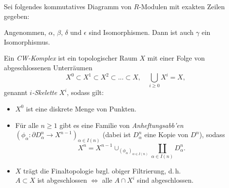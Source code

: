 \documentclass{cheat-sheet}
\begin{document}
\begin{lem}
  Sei folgendes kommutatives Diagramm von $R$-Modulen mit exakten Zeilen gegeben:
  \begin{center}
  \end{center}
  Angenommen, $\alpha$, $\beta$, $\delta$ und $\epsilon$ sind Isomorphismen. Dann ist auch $\gamma$ ein Isomorphismus.
\end{lem}


\begin{defn}
  Ein \emph{CW-Komplex} ist ein topologischer Raum $X$ mit einer Folge von abgeschlossenen Unterräumen
  \[
    X^0 \subset X^1 \subset X^2 \subset ... \subset X, \quad
    \bigcup_{i \geq 0} X^i = X,
  \]
  genannt \emph{$i$-Skelette} $X^i$, sodass gilt:
  \begin{itemize}
    \item $X^0$ ist eine diskrete Menge von Punkten.
    \item Für alle $n \geq 1$ gibt es eine Familie von \emph{Anheftungsabb'en} $(\phi_\alpha : \partial D^n_\alpha \to X^{n-1})_{\alpha \in I(n)}$ (dabei ist $D^n_\alpha$ eine Kopie von $D^n$), sodass
    \[ X^n = X^{n-1} \cup_{(\phi_\alpha)_{\alpha \in I(n)}} \coprod_{\alpha \in I(n)} D^n_\alpha. \]
    \item $X$ trägt die Finaltopologie bzgl. obiger Filtrierung, d.\,h. \\
    $A \subset X$ ist abgeschlossen $\iff$ alle $A \cap X^i$ sind abgeschlossen.
  \end{itemize}
\end{defn}
\end{document}
